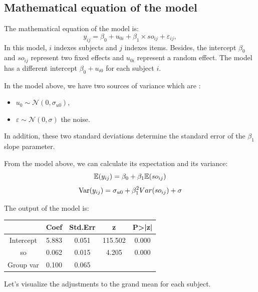 \documentclass{article}
\begin{document}
\subsection{Mathematical equation of the model}
The mathematical equation of the model is:
\[y_{ij}= \beta_0 + u_{0i} + \beta_1 \times so_{ij} + \varepsilon_{ij},\]
In this model, $i$ indexes subjects and $j$ indexes items.
Besides, the intercept $\beta_0$ and $so_{ij}$  represent two fixed effects and $u_{0i}$ represent a random effect. The model has a different intercept $\beta_0 + u_{i0}$ for each subject $i$.

In the model above, we have two sources of variance which are :
\begin{itemize}
    \item $u_0 \sim \mathcal{N}(0,\sigma_{u0})$,
    \item $\varepsilon \sim \mathcal{N}(0, \sigma)$ the noise.
\end{itemize}

In addition, these two standard deviations determine the standard error of the $\beta_1$ slope parameter.

From the model above, we can calculate its expectation and its variance: 
$$\mathbb{E}(y_{ij})=\beta_0 + \beta_1 \mathbb{E}(so_{ij})$$
$$\operatorname{Var}(y_{ij})=\sigma_{u0} + \beta_1^2 Var(so_{ij}) + \sigma$$

The output of the model is:
\begin{center}
    \begin{tabular}{|c|c|c|c|c|}
    \hline
         & Coef & Std.Err & z & P>|z|   \\
         \hline \hline
        Intercept & 5.883 & 0.051 & 115.502 & 0.000\\
         so & 0.062 & 0.015 & 4.205 & 0.000 \\
         Group var &  0.100 & 0.065 &  & \\
         \hline
    \end{tabular}
\end{center}

Let's visualize the adjustments to the grand mean for each subject.
\end{document}
